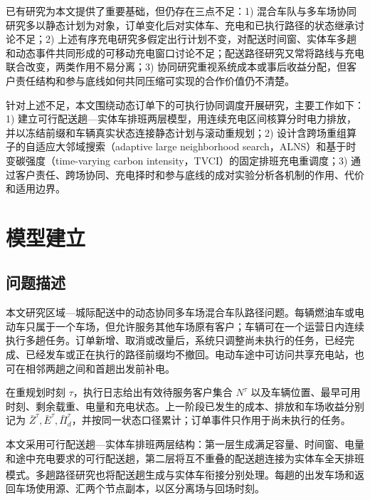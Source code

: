 \documentclass{setp-new}
\newif\ifESevenReady
\begin{document}
已有研究为本文提供了重要基础，但仍存在三点不足：1) 混合车队与多车场协同研究多以静态计划为对象，订单变化后对实体车、充电和已执行路径的状态继承讨论不足；2) 上述有序充电研究多假定出行计划不变，对配送时间窗、实体车多趟和动态事件共同形成的可移动充电窗口讨论不足；配送路径研究又常将路线与充电联合改变，两类作用不易分离；3) 协同研究重视系统成本或事后收益分配，但客户责任结构和参与底线如何共同压缩可实现的合作价值仍不清楚。

针对上述不足，本文围绕动态订单下的可执行协同调度开展研究，主要工作如下：1) 建立可行配送趟—实体车排班两层模型，用连续充电区间核算分时电力排放，并以冻结前缀和车辆真实状态连接静态计划与滚动重规划；2) 设计含跨场重组算子的自适应大邻域搜索（adaptive large neighborhood search，ALNS）和基于时变碳强度（time-varying carbon intensity，TVCI）的固定排班充电重调度；3) 通过客户责任、跨场协同、充电择时和参与底线的成对实验分析各机制的作用、代价和适用边界。\ifESevenReady 动态订单实验进一步比较完整机制与三类对照在执行阶段的经济结果、可执行性和计算时限。\fi


\section{模型建立}

\subsection{问题描述}

本文研究区域—城际配送中的动态协同多车场混合车队路径问题。每辆燃油车或电动车只属于一个车场，但允许服务其他车场原有客户；车辆可在一个运营日内连续执行多趟任务。订单新增、取消或改量后，系统只调整尚未执行的任务，已经完成、已经发车或正在执行的路径前缀均不撤回。电动车途中可访问共享充电站，也可在相邻两趟之间和首趟出发前补电。

在重规划时刻 $\tau$，执行日志给出有效待服务客户集合 $N^\tau$ 以及车辆位置、最早可用时刻、剩余载重、电量和充电状态。上一阶段已发生的成本、排放和车场收益分别记为 $\bar Z^\tau,\bar E^\tau,\bar\Pi_d^\tau$，并按同一状态口径累计；订单事件只作用于尚未执行的任务。

本文采用可行配送趟—实体车排班两层结构：第一层生成满足容量、时间窗、电量和途中充电要求的可行配送趟，第二层将互不重叠的配送趟连接为实体车全天排班模式。多趟路径研究也将配送趟生成与实体车衔接分别处理\textsuperscript{\cite{ref:44}}。每趟的出发车场和返回车场使用源、汇两个节点副本，以区分离场与回场时刻。
\end{document}
